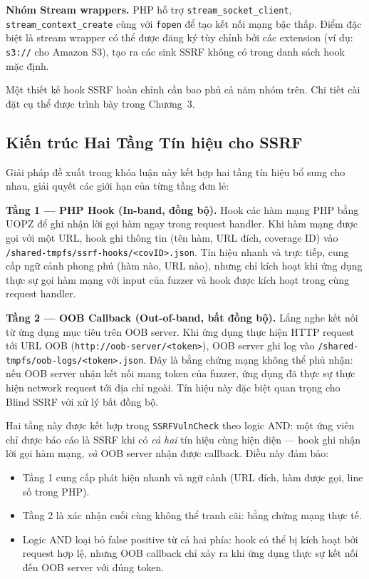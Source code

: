 \textbf{Nhóm Stream wrappers.} PHP hỗ trợ \texttt{stream\_socket\_client},
\texttt{stream\_context\_create} cùng với \texttt{fopen} để tạo kết nối mạng
bậc thấp. Điểm đặc biệt là stream wrapper có thể được đăng ký tùy chỉnh bởi
các extension (ví dụ: \texttt{s3://} cho Amazon S3), tạo ra các sink SSRF
không có trong danh sách hook mặc định.

Một thiết kế hook SSRF hoàn chỉnh cần bao phủ cả năm nhóm trên. Chi tiết
cài đặt cụ thể được trình bày trong Chương~3.

\subsection{Kiến trúc Hai Tầng Tín hiệu cho SSRF}
\label{subsec:two-layer}

Giải pháp đề xuất trong khóa luận này kết hợp hai tầng tín hiệu bổ sung cho
nhau, giải quyết các giới hạn của từng tầng đơn lẻ:

\textbf{Tầng 1 --- PHP Hook (In-band, đồng bộ).} Hook các hàm mạng PHP bằng
UOPZ để ghi nhận lời gọi hàm ngay trong request handler. Khi hàm mạng được
gọi với một URL, hook ghi thông tin (tên hàm, URL đích, coverage ID) vào
\texttt{/shared-tmpfs/ssrf-hooks/<covID>.json}. Tín hiệu nhanh và trực tiếp,
cung cấp ngữ cảnh phong phú (hàm nào, URL nào), nhưng chỉ kích hoạt khi
ứng dụng thực sự gọi hàm mạng với input của fuzzer và hook được kích hoạt
trong cùng request handler.

\textbf{Tầng 2 --- OOB Callback (Out-of-band, bất đồng bộ).} Lắng nghe kết
nối từ ứng dụng mục tiêu trên OOB server. Khi ứng dụng thực hiện HTTP request
tới URL OOB (\texttt{http://oob-server/<token>}), OOB server ghi log vào
\texttt{/shared-tmpfs/oob-logs/<token>.json}. Đây là bằng chứng mạng không
thể phủ nhận: nếu OOB server nhận kết nối mang token của fuzzer, ứng dụng đã
thực sự thực hiện network request tới địa chỉ ngoài. Tín hiệu này đặc biệt
quan trọng cho Blind SSRF với xử lý bất đồng bộ.

Hai tầng này được kết hợp trong \texttt{SSRFVulnCheck} theo logic \textsc{AND}:
một ứng viên chỉ được báo cáo là SSRF khi có \emph{cả hai} tín hiệu cùng
hiện diện --- hook ghi nhận lời gọi hàm mạng, \emph{và} OOB server nhận được
callback. Điều này đảm bảo:
\begin{itemize}
    \item Tầng 1 cung cấp phát hiện nhanh và ngữ cảnh (URL đích, hàm được
    gọi, line số trong PHP).
    \item Tầng 2 là xác nhận cuối cùng không thể tranh cãi: bằng chứng mạng
    thực tế.
    \item Logic AND loại bỏ false positive từ cả hai phía: hook có thể bị
    kích hoạt bởi request hợp lệ, nhưng OOB callback chỉ xảy ra khi ứng dụng
    thực sự kết nối đến OOB server với đúng token.
\end{itemize}

